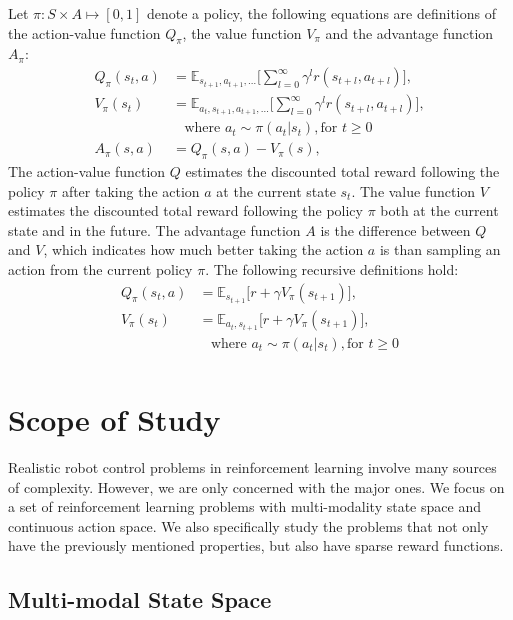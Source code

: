 Let $\pi : S \times A \mapsto [0,1] $ denote a policy, the following equations are definitions of the action-value function $Q_\pi $, the value function $V_\pi $ and the advantage function $A_\pi $:
\begin{align}
Q_\pi(s_t,a) &= \mathbb{E}_{s_{t+1},a_{t+1},\ldots}
\big[ \sum_{l=0}^\infty \gamma^l r(s_{t+l},a_{t+l}) \big], \\
V_\pi(s_t) &= \mathbb{E}_{a_{t},s_{t+1},a_{t+1},\ldots}
\big[ \sum_{l=0}^\infty \gamma^l  r(s_{t+l},a_{t+l}) \big],\\
& \ \ \ \ \text{where } a_t \sim \pi (a_t|s_t), \text{for } t \geq 0  \\
A_\pi (s,a) &= Q_\pi (s,a) - V_\pi (s), 
\end{align}
The action-value function $Q$ estimates the discounted total reward following the policy $\pi$ after taking the action $a$ at the current state $s_t$. The value function $V$ estimates the discounted total reward following the policy $\pi$ both at the current state and in the future. The advantage function $A$ is the difference between $Q$ and $V$, which indicates how much better taking the action $a$ is than sampling an action from the current policy $\pi$.
The following recursive definitions hold:
\begin{align}
Q_\pi(s_t,a) &= \mathbb{E}_{s_{t+1}}
\big[ r + \gamma V_\pi(s_{t+1}) \big], \\
V_\pi(s_t) &= \mathbb{E}_{a_{t},s_{t+1}}
\big[ r + \gamma V_\pi(s_{t+1}) \big],\\
& \ \ \ \ \text{where } a_t \sim \pi (a_t|s_t), \text{for } t \geq 0  \\
\end{align}



\section{Scope of Study}
Realistic robot control problems in reinforcement learning involve many sources of complexity. However, we are only concerned with the major ones.
We focus on a set of reinforcement learning problems with multi-modality state space and continuous action space. We also specifically study the problems that not only have the previously mentioned properties, but also have sparse reward functions.

\subsection{Multi-modal State Space}

